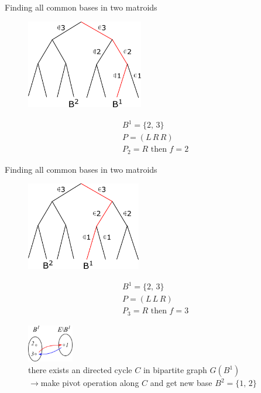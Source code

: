 \documentclass[11pt,xcolor=dvipsnames,table,dvipdfmx]{beamer}
\begin{document}
\begin{frame}{Finding all common bases in two matroids}
 \begin{figure}
  \centering
  \hspace{0.1cm}
  \includegraphics[width=5.1cm]{text4989-2.png}
 \end{figure}
 \begin{align*}
  &B^1 = \{2,\,3\}\\
  &P = (L\,R\,R)\\
  &P_2 = R \text{ then } f = 2
 \end{align*}
\end{frame}

\begin{frame}{Finding all common bases in two matroids}
 \begin{figure}
  \centering
  \hspace{0.03cm}
  \includegraphics[width=5cm]{text4989-3.png}
 \end{figure}
 \begin{align*}
  &B^1 = \{2,\,3\}\\
  &P = (L\,L\,R)\\
  &P_3 = R \text{ then } f = 3
 \end{align*}
\end{frame}

\begin{frame}
 \begin{figure}
  \centering
  \includegraphics[width=2cm]{path16961.png}\\
  there exists an directed cycle $C$ in bipartite graph $G(B^1)$\\
  $\rightarrow$make pivot operation along $C$ and get new base $B^2 = \{1,\,2\}$ 
 \end{figure}
\end{frame}
\end{document}
